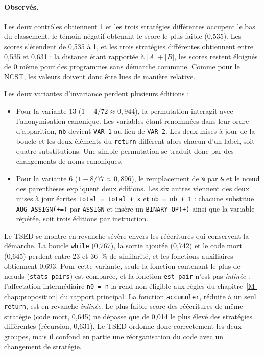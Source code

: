 \documentclass[12pt,a4paper,oneside]{report}
\begin{document}
\paragraph{Observés.}
Les deux contrôles obtiennent 1 et les trois stratégies différentes occupent
le bas du classement, le témoin négatif obtenant le score le plus faible
(0,535). Les scores s'étendent de 0,535 à 1, et les trois stratégies
différentes obtiennent entre 0,535 et 0,631 : la distance étant rapportée à
$|A| + |B|$, les scores restent éloignés de 0 même pour des programmes sans
démarche commune. Comme pour le NCST, les valeurs doivent donc être lues de
manière relative.

Les deux variantes d'invariance perdent plusieurs éditions :
\begin{itemize}
  \item Pour la variante 13 ($1 - 4/72 \approx 0{,}944$), la permutation interagit
        avec l'anonymisation canonique. Les variables étant renommées dans
        leur ordre d'apparition, \texttt{nb} devient \texttt{VAR\_1} au lieu
        de \texttt{VAR\_2}. Les deux mises à jour de la boucle et les deux
        éléments du \texttt{return} diffèrent alors chacun d'un label, soit
        quatre substitutions. Une simple permutation se traduit donc par des
        changements de noms canoniques.
  \item Pour la variante 6 ($1 - 8/77 \approx 0{,}896$), le remplacement de
        \texttt{\%} par \texttt{\&} et le nœud des parenthèses expliquent
        deux éditions. Les six autres viennent des deux mises à jour écrites
        \texttt{total = total + x} et \texttt{nb = nb + 1} : chacune
        substitue \texttt{AUG\_ASSIGN(+=)} par \texttt{ASSIGN} et insère un
        \texttt{BINARY\_OP(+)} ainsi que la variable répétée, soit trois
        éditions par instruction.
\end{itemize}

Le TSED se montre en revanche sévère envers les réécritures qui conservent la
démarche. La boucle \texttt{while} (0,767), la sortie ajoutée (0,742) et le
code mort (0,645) perdent entre 23 et 36~\% de similarité, et les
fonctions auxiliaires obtiennent 0,693. Pour cette variante, seule la fonction
contenant le plus de nœuds (\texttt{stats\_pairs}) est comparée, et la
fonction \texttt{est\_pair} n'est pas \emph{inlinée} : l'affectation
intermédiaire \texttt{n0 = n} la rend non éligible aux règles du chapitre~\ref{M-chap:proposition}
du rapport principal. La fonction \texttt{accumuler}, réduite à un seul \texttt{return},
est en revanche \emph{inlinée}. Le plus faible score des réécritures de même
stratégie (code mort, 0,645) ne dépasse que de 0,014 le plus élevé des
stratégies différentes (récursion, 0,631). Le TSED ordonne donc correctement
les deux groupes, mais il confond en partie une réorganisation du code avec
un changement de stratégie.
\end{document}
